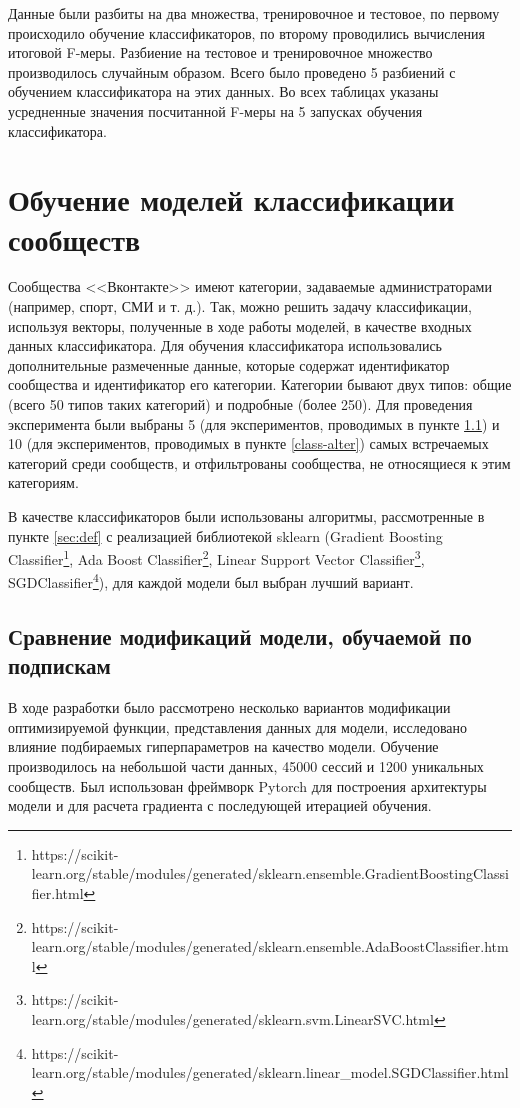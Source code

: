 \documentclass[times,specification,annotation]{itmo-student-thesis}
\begin{document}
Данные были разбиты на два множества, тренировочное и тестовое, по первому происходило обучение классификаторов, по второму проводились вычисления итоговой F-меры. Разбиение на тестовое и тренировочное множество производилось случайным образом. Всего было проведено 5 разбиений с обучением классификатора на этих данных. Во всех таблицах указаны усредненные значения посчитанной F-меры на 5 запусках обучения классификатора.

\section{Обучение моделей классификации сообществ}\label{sec:class}

Сообщества <<Вконтакте>> имеют категории, задаваемые администраторами
(например, спорт, СМИ и т. д.). Так, можно решить задачу классификации,
используя векторы, полученные в ходе работы моделей, в качестве входных
данных классификатора.  Для обучения классификатора использовались дополнительные размеченные данные, которые содержат идентификатор сообщества и идентификатор его категории. Категории бывают двух типов: общие (всего 50 типов таких категорий) и подробные (более 250). Для проведения эксперимента были выбраны 5 (для экспериментов, проводимых в пункте \ref{class-model}) и 10 (для экспериментов, проводимых в пункте \ref{class-alter}) самых встречаемых категорий среди сообществ, и отфильтрованы сообщества, не относящиеся к этим категориям.

В качестве классификаторов были использованы алгоритмы, рассмотренные в пункте \ref{sec:def} с реализацией библиотекой sklearn (Gradient Boosting Classifier\footnote{https://scikit-learn.org/stable/modules/generated/sklearn.ensemble.GradientBoostingClassifier.html}, Ada Boost Classifier\footnote{https://scikit-learn.org/stable/modules/generated/sklearn.ensemble.AdaBoostClassifier.html}, Linear Support Vector Classifier\footnote{https://scikit-learn.org/stable/modules/generated/sklearn.svm.LinearSVC.html}, SGDClassifier\footnote{https://scikit-learn.org/stable/modules/generated/sklearn.linear\_model.SGDClassifier.html}), для каждой модели был выбран лучший вариант. 

\subsection{Сравнение модификаций модели, обучаемой по подпискам}\label{class-model}

В ходе разработки было рассмотрено несколько вариантов модификации оптимизируемой функции, представления данных для модели, исследовано влияние подбираемых гиперпараметров на качество модели. Обучение производилось на небольшой части данных, 45000 сессий и 1200 уникальных сообществ. Был использован фреймворк Pytorch для построения архитектуры модели и для расчета градиента с последующей итерацией обучения.
\end{document}
